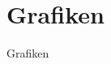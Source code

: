 \documentclass{beamer}
\begin{document}


\section{Grafiken}
\begin{frame}
 \begin{center}
  \Huge Grafiken
 \end{center}
\end{frame}
% 
\end{document}

